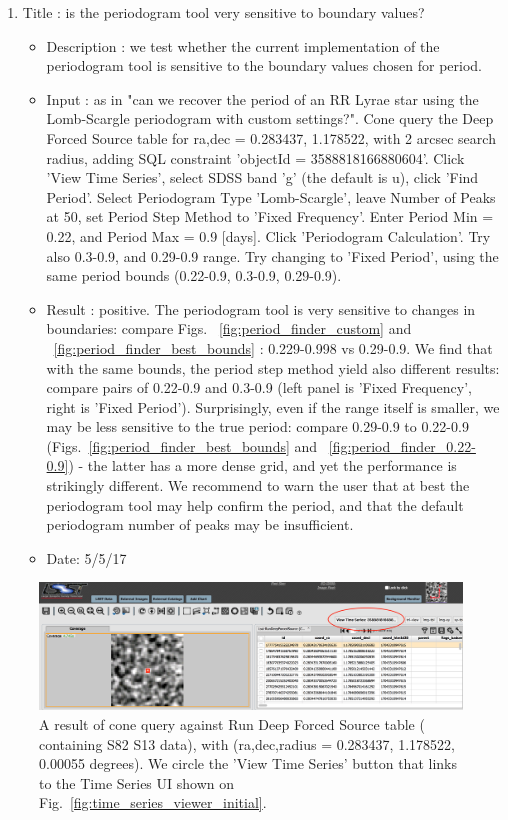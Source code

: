 \documentclass[DM,lsstdraft,toc,usenatbib]{lsstdoc}
\begin{document}
\begin{enumerate}
 \item Title : is the periodogram tool very sensitive to boundary values? 
    \begin{itemize}
      \item Description : we test whether the current implementation of the periodogram tool is sensitive to the boundary values chosen for period. 
      \item Input : as in "can we recover the period of an RR Lyrae  star using the Lomb-Scargle periodogram with custom settings?". Cone query the Deep Forced Source table for ra,dec = 0.283437\degree, 1.178522\degree, with 2 arcsec search radius, adding SQL constraint 'objectId = 3588818166880604'. Click 'View Time Series', select SDSS band 'g' (the default is u), click 'Find Period'. Select Periodogram Type 'Lomb-Scargle', leave Number of Peaks at 50, set Period Step Method to 'Fixed Frequency'. Enter Period Min = 0.22,  and Period Max = 0.9  [days]. Click 'Periodogram Calculation'. Try also 0.3-0.9, and 0.29-0.9  range. Try changing to 'Fixed Period', using the same period bounds (0.22-0.9,  0.3-0.9, 0.29-0.9). 
      \item Result : positive. The periodogram tool is very sensitive to changes in boundaries: compare Figs. ~\ref{fig:period_finder_custom} and ~\ref{fig:period_finder_best_bounds} : 0.229-0.998 vs  0.29-0.9.  We find that with the same bounds, the period step method yield also different results: compare pairs of  0.22-0.9  and 0.3-0.9 (left panel is  'Fixed Frequency', right is 'Fixed Period'). Surprisingly, even if the range itself is smaller, we may be less sensitive to the true period: compare 0.29-0.9 to 0.22-0.9 (Figs.~\ref{fig:period_finder_best_bounds} and ~\ref{fig:period_finder_0.22-0.9}) - the latter has a more dense grid, and yet the performance is strikingly different. We recommend to warn the user that at best the periodogram tool may help confirm the period, and that the default periodogram number of peaks may be insufficient. 
      \item Date: 5/5/17
    \end{itemize}

\end{enumerate}



\begin{figure}
\includegraphics[width=\textwidth]{figs/PDAC_cone_result}
\caption{A result of cone query against Run Deep Forced Source table ( containing S82 S13 data), with (ra,dec,radius = 0.283437, 1.178522, 0.00055 degrees). We circle the 'View Time Series' button that links to the Time Series UI  shown on Fig.~\ref{fig:time_series_viewer_initial}. }
\label{fig:time_series_cone_result}
\end{figure}
\end{document}
